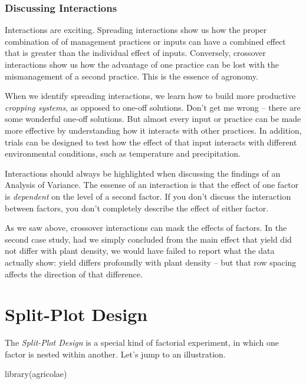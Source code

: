 \documentclass[
]{book}
\newenvironment{Shaded}{\begin{snugshade}}{\end{snugshade}}
\newcommand{\FunctionTok}[1]{\textcolor[rgb]{0.00,0.00,0.00}{#1}}
\newcommand{\NormalTok}[1]{#1}
\begin{document}
\hypertarget{discussing-interactions-1}{%
\subsubsection{Discussing Interactions}\label{discussing-interactions-1}}

Interactions are exciting. Spreading interactions show us how the proper combination of of management practices or inputs can have a combined effect that is greater than the individual effect of inputs. Conversely, crossover interactions show us how the advantage of one practice can be lost with the mismanagement of a second practice. This is the essence of agronomy.

When we identify spreading interactions, we learn how to build more productive \emph{cropping systems}, as opposed to one-off solutions. Don't get me wrong -- there are some wonderful one-off solutions. But almost every input or practice can be made more effective by understanding how it interacts with other practices. In addition, trials can be designed to test how the effect of that input interacts with different environmental conditions, such as temperature and precipitation.

Interactions should always be highlighted when discussing the findings of an Analysis of Variance. The essense of an interaction is that the effect of one factor is \emph{dependent} on the level of a second factor. If you don't discuss the interaction between factors, you don't completely describe the effect of either factor.

As we saw above, crossover interactions can mask the effects of factors. In the second case study, had we simply concluded from the main effect that yield did not differ with plant density, we would have failed to report what the data actually show: yield differs profoundly with plant density -- but that row spacing affects the direction of that difference.

\hypertarget{split-plot-design}{%
\section{Split-Plot Design}\label{split-plot-design}}

The \emph{Split-Plot Design} is a special kind of factorial experiment, in which one factor is nested within another. Let's jump to an illustration.

\begin{Shaded}
\begin{Highlighting}[]
\FunctionTok{library}\NormalTok{(agricolae)}
\end{Highlighting}
\end{Shaded}
\end{document}
